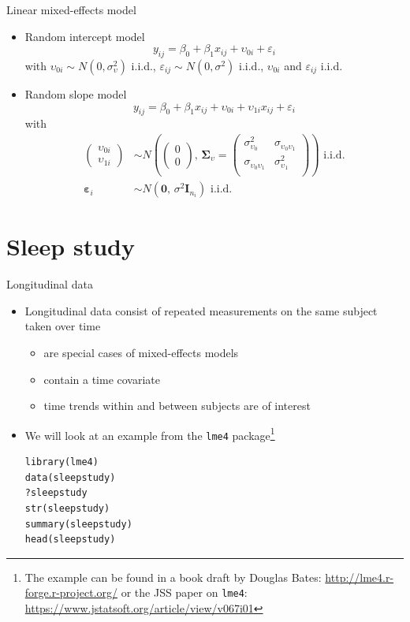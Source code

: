 \documentclass[aspectratio=169]{beamer}
\newcommand{\vect}[1]{\mathbf{#1}}
\newcommand{\mat}[1]{\mathbf{#1}}
\newcommand{\gvect}[1]{\boldsymbol{#1}}
\newcommand{\gmat}[1]{\boldsymbol{#1}}
\begin{document}
\begin{frame}{Linear mixed-effects model}
\begin{itemize}
  \item Random intercept model
\[y_{ij} = \beta_0 + \beta_1 x_{ij} + \upsilon_{0i} + \varepsilon_i\]
with $\upsilon_{0i} \sim N(0, \sigma^2_{\upsilon})$ i.i.d.,
$\varepsilon_{ij} \sim N(0, \sigma^2)$ i.i.d., $\upsilon_{0i}$ and
$\varepsilon_{ij}$ i.i.d.\\[2ex]
  \item Random slope model
\[y_{ij} = \beta_0 + \beta_1 x_{ij} + \upsilon_{0i} + \upsilon_{1i} x_{ij} + \varepsilon_i\]
with
\begin{align*}
  \begin{pmatrix} \upsilon_{0i}\\ \upsilon_{1i} \end{pmatrix} &\sim
    N \left(\begin{pmatrix} 0\\ 0 \end{pmatrix}, \, \gmat{\Sigma}_\upsilon =
      \begin{pmatrix}
        \sigma^2_{\upsilon_0} & \sigma_{\upsilon_0 \upsilon_1} \\
        \sigma_{\upsilon_0 \upsilon_1} & \sigma^2_{\upsilon_1} \\
      \end{pmatrix} \right)
    \text{ i.i.d.} \\
  \gvect{\varepsilon}_i &\sim N(\vect{0}, \, \sigma^2 \mat{I}_{n_i})
    \text{ i.i.d.}
\end{align*}
\end{itemize}
\end{frame}

\section{Sleep study}

\begin{frame}[fragile]{Longitudinal data}
  \begin{itemize}
    \item Longitudinal data consist of repeated measurements on the same
      subject taken over time
  \begin{itemize}
    \item are special cases of mixed-effects models
    \item contain a time covariate
    \item time trends within and between subjects are of interest
  \end{itemize}
\item We will look at an example from the \texttt{lme4}
  package\footnote{The example can be found in a book draft by Douglas
      Bates: \url{http://lme4.r-forge.r-project.org/} or the JSS paper on
      \texttt{lme4}: \url{https://www.jstatsoft.org/article/view/v067i01}}
  \begin{lstlisting}
library(lme4)
data(sleepstudy)
?sleepstudy
str(sleepstudy)
summary(sleepstudy)
head(sleepstudy)
  \end{lstlisting}
  \end{itemize}
\nocite{Bates2010lme4, Bates2015}
\end{frame}
\end{document}
